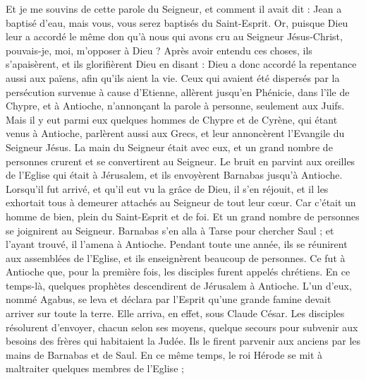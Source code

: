 \begin{multicols}{2}
Et je me souvins de cette parole du Seigneur, et comment il avait dit : Jean a baptisé d'eau, mais vous, vous serez baptisés du Saint-Esprit.
Or, puisque Dieu leur a accordé le même don qu'à nous qui avons cru au Seigneur Jésus-Christ, pouvais-je, moi, m'opposer à Dieu ?
Après avoir entendu ces choses, ils s'apaisèrent, et ils glorifièrent Dieu en disant : Dieu a donc accordé la repentance aussi aux païens, afin qu’ils aient la vie.
Ceux qui avaient été dispersés par la persécution survenue à cause d'Etienne, allèrent jusqu'en Phénicie, dans l’île de Chypre, et à Antioche, n’annonçant la parole à personne, seulement aux Juifs.
Mais il y eut parmi eux quelques hommes de Chypre et de Cyrène, qui étant venus à Antioche, parlèrent aussi aux Grecs, et leur annoncèrent l’Evangile du Seigneur Jésus.
La main du Seigneur était avec eux, et un grand nombre de personnes crurent et se convertirent au Seigneur.
Le bruit en parvint aux oreilles de l'Eglise qui était à Jérusalem, et ils envoyèrent Barnabas jusqu’à Antioche.
Lorsqu’il fut arrivé, et qu’il eut vu la grâce de Dieu, il s'en réjouit, et il les exhortait tous à demeurer attachés au Seigneur de tout leur cœur.
Car c’était un homme de bien, plein du Saint-Esprit et de foi. Et un grand nombre de personnes se joignirent au Seigneur.
Barnabas s'en alla à Tarse pour chercher Saul ;
et l'ayant trouvé, il l’amena à Antioche. Pendant toute une année, ils se réunirent aux assemblées de l’Eglise, et ils enseignèrent beaucoup de personnes. Ce fut à Antioche que, pour la première fois, les disciples furent appelés chrétiens.
En ce temps-là, quelques prophètes descendirent de Jérusalem à Antioche.
L’un d'eux, nommé Agabus, se leva et déclara par l'Esprit qu'une grande famine devait arriver sur toute la terre. Elle arriva, en effet, sous Claude César.
Les disciples résolurent d’envoyer, chacun selon ses moyens, quelque secours pour subvenir aux besoins des frères qui habitaient la Judée.
Ils le firent parvenir aux anciens par les mains de Barnabas et de Saul.
\VerseOne{}En ce même temps, le roi Hérode se mit à maltraiter quelques membres de l'Eglise ;

\end{multicols}
